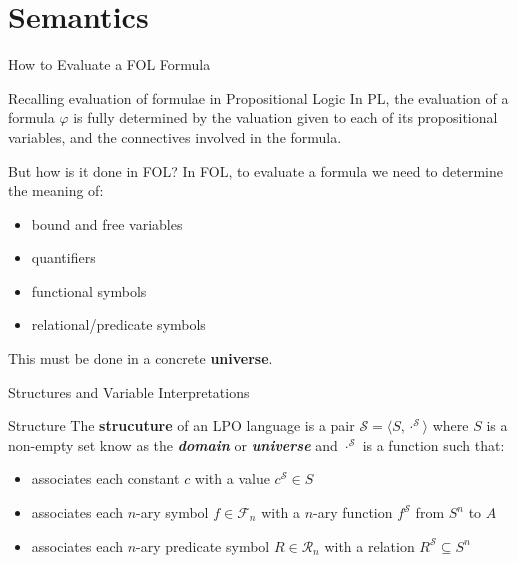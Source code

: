 \documentclass[aspectratio=169]{beamer}
\begin{document}
\section*{Semantics}

\begin{slide}{How to Evaluate a FOL Formula}
  \begin{block}{Recalling evaluation of formulae in Propositional Logic}
  In PL, the evaluation of a formula $\varphi$ is fully determined by the valuation given to each of its propositional variables, and the connectives involved in the formula.  
  \end{block}
  
  \begin{block}{But how is it done in FOL?}
  In FOL, to evaluate a formula we need to determine the meaning of:
    \begin{itemize}
    \item bound and free variables
    \item quantifiers
    \item functional symbols
    \item relational/predicate symbols
    \end{itemize}
    This must be done in a concrete {\bf universe}.
  \end{block}
\end{slide}

\begin{slide}{Structures and Variable Interpretations}

\begin{block}{Structure}
The {\bf strucuture} of an LPO language is a pair $\mathcal{S} = \langle S, \cdot^\mathcal{S} \rangle$ where $S$ is a non-empty set know as the \textbf{\textit{domain}} or \textbf{\textit{universe}} and $\cdot^\mathcal{S}$ is a function such that:
\begin{itemize}
  \item associates each constant $c$ with a value $c^\mathcal{S} \in S$
  \item associates each $n$-ary symbol $f \in \mathcal{F}_n$ with a $n$-ary function $f^\mathcal{S}$ from $S^n$ to $A$
  \item associates each $n$-ary predicate symbol $R \in \mathcal{R}_n$ with a relation $R^\mathcal{S} \subseteq S^n$
\end{itemize}
\end{block}
\end{slide}
\end{document}
